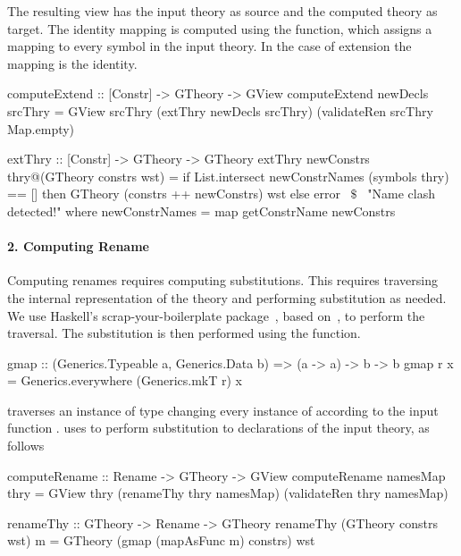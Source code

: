 The resulting view has the input theory as source and the computed theory as target. The identity mapping is computed using the  function, which assigns a mapping to every symbol in the input theory. In the case of extension the mapping is the identity. 
\begin{hscode}
computeExtend :: [Constr] -> GTheory -> GView
computeExtend newDecls srcThry =
  GView srcThry (extThry newDecls srcThry) (validateRen srcThry Map.empty)

extThry :: [Constr] -> GTheory -> GTheory 
extThry newConstrs thry@(GTheory constrs wst) =
  if List.intersect newConstrNames (symbols thry) == []
  then GTheory (constrs ++ newConstrs) wst
  else error ~$\$$~ "Name clash detected!"
    where newConstrNames = map getConstrName newConstrs
\end{hscode}

\paragraph{2. Computing Rename}
Computing renames requires computing substitutions. This requires traversing the internal representation of the theory and performing substitution as needed. We use Haskell's scrap-your-boilerplate package~\cite{syb}, based on~\cite{syb2003Jones}, to perform the traversal. The substitution is then performed using the  function. 
\begin{hscode} 
gmap :: (Generics.Typeable a, Generics.Data b) => (a -> a) -> b -> b
gmap r x = Generics.everywhere (Generics.mkT r) x  
\end{hscode} 
 traverses an instance of type  changing every instance of  according to the input function .  uses  to perform substitution to declarations of the input theory, as follows
\begin{hscode}
computeRename :: Rename -> GTheory -> GView  
computeRename namesMap thry =
  GView thry (renameThy thry namesMap) (validateRen thry namesMap)

renameThy :: GTheory -> Rename -> GTheory
renameThy (GTheory constrs wst) m =
  GTheory (gmap (mapAsFunc m) constrs) wst
\end{hscode}

